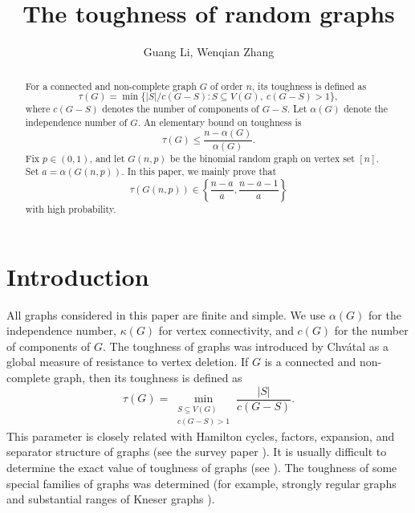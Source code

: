 \documentclass[11pt,reqno]{amsart}
\title[The toughness of random graphs]{The toughness of random graphs}
\author{Guang Li, Wenqian Zhang}
\theoremstyle{definition}
\theoremstyle{remark}
\begin{document}
\begin{abstract}
For a connected and non-complete  graph $G$ of order $n$, its toughness is defined as
\[
 \tau(G)=\min\bigl\{|S|/c(G-S):S\subseteq V(G),\ c(G-S)>1\bigr\},
\]
where $c(G-S)$ denotes the number of components of $G-S$. Let $\alpha(G)$ denote the independence number of $G$. An elementary bound on toughness is 
$$\tau(G)\leq\frac{n-\alpha(G)}{\alpha(G)}.$$
 Fix $p\in(0,1)$, and let $G(n,p)$ be the binomial random graph on vertex set $[n]$. Set $a=\alpha(G(n,p))$. In this paper, we mainly prove that
\[
 \tau(G(n,p))\in\left\{\frac{n-a}{a},\frac{n-a-1}{a}\right\}
\] 
with high probability. 



\end{abstract}

\maketitle

\section{Introduction}

All graphs considered in this paper are finite and simple.  We use $\alpha(G)$ for the independence number, $\kappa(G)$ for vertex connectivity, and $c(G)$ for the number of components of $G$. The toughness of graphs was introduced by Chv\'atal \cite{Chvatal1973} as a global measure of resistance to vertex deletion.  If $G$ is a  connected and non-complete graph, then its toughness is defined as
\begin{equation}\label{eq:toughness-definition}
 \tau(G)=\min_{\substack{S\subseteq V(G)\\c(G-S)>1}}
 \frac{|S|}{c(G-S)}.
\end{equation}
  This parameter is closely related with Hamilton cycles, factors, expansion, and separator structure of graphs (see the survey paper \cite{BBS2006}).  It is usually difficult to determine the exact value of toughness of graphs (see \cite{BauerHakimiSchmeichel1990}). The toughness of some special families of graphs was determined (for example,  strongly regular graphs \cite{CioabaWong2014} and substantial ranges of Kneser graphs \cite{ParkEtAl2021}).  
\end{document}

